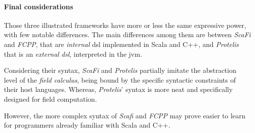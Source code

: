 \paragraph{Final considerations}
Those three illustrated frameworks have more or less the same expressive power, with few notable differences.
The main differences among them are between \emph{ScaFi} and \emph{FCPP}, that are \emph{internal} \ac{dsl} implemented in Scala
and C++, and \emph{Protelis} that is an \emph{external} \emph{dsl}, interpreted in the \ac{jvm}.

Considering their syntax, \emph{ScaFi} and \emph{Protelis} partially imitate the abstraction level of the \emph{field calculus},
being bound by the specific syntactic constraints of their host languages.
Whereas, \emph{Protelis}' syntax is more neat and specifically designed for field computation.

However, the more complex syntax of \emph{Scafi} and \emph{FCPP} may prove easier to learn for programmers already familiar with Scala and C++.